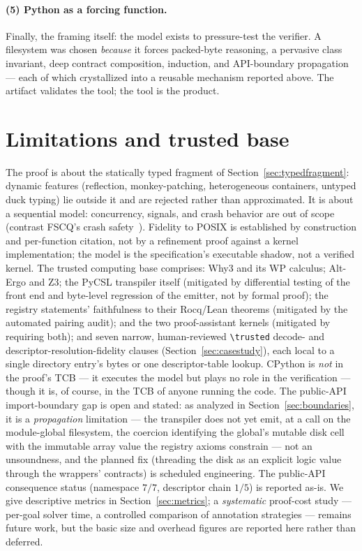 \documentclass[11pt]{article}
\newcommand{\pycsl}{\textsf{PyCSL}}
\newcommand{\why}{\textsf{Why3}}
\newcommand{\altergo}{\textsf{Alt-Ergo}}
\newcommand{\zthree}{\textsf{Z3}}
\newcommand{\rocq}{\textsf{Rocq}}
\newcommand{\lean}{\textsf{Lean}}
\begin{document}
\paragraph{(5) Python as a forcing function.}
Finally, the framing itself: the model exists to pressure-test the verifier.
A filesystem was chosen \emph{because} it forces packed-byte reasoning, a
pervasive class invariant, deep contract composition, induction, and
API-boundary propagation --- each of which crystallized into a reusable
mechanism reported above. The artifact validates the tool; the tool is the
product.

\section{Limitations and trusted base}\label{sec:limits}

The proof is about the statically typed fragment of
Section~\ref{sec:typedfragment}: dynamic features (reflection,
monkey-patching, heterogeneous containers, untyped duck typing) lie outside
it and are rejected rather than approximated. It is about a sequential
model: concurrency, signals, and crash behavior are out of scope (contrast FSCQ's crash safety~\cite{fscq}).
Fidelity to POSIX is established by construction and per-function citation,
not by a refinement proof against a kernel implementation; the model is the
specification's executable shadow, not a verified kernel. The trusted
computing base comprises: \why{} and its WP calculus; \altergo{} and
\zthree{}; the \pycsl{} transpiler itself (mitigated by differential testing
of the front end and byte-level regression of the emitter, not by formal
proof); the registry statements' faithfulness to their \rocq{}/\lean{}
theorems (mitigated by the automated pairing audit); and the two
proof-assistant kernels (mitigated by requiring both); and seven narrow,
human-reviewed \texttt{\textbackslash trusted} decode- and
descriptor-resolution-fidelity clauses (Section~\ref{sec:casestudy}), each
local to a single directory entry's bytes or one descriptor-table lookup.
CPython is \emph{not} in the proof's TCB --- it executes the model but plays no
role in the verification --- though it is, of course, in the TCB of anyone
running the code. The public-API import-boundary gap is open and stated: as analyzed in
Section~\ref{sec:boundaries}, it is a \emph{propagation} limitation --- the
transpiler does not yet emit, at a call on the module-global filesystem, the
coercion identifying the global's mutable disk cell with the immutable array
value the registry axioms constrain --- not an unsoundness, and the planned fix
(threading the disk as an explicit logic value through the wrappers' contracts)
is scheduled engineering. The public-API consequence status (namespace $7/7$,
descriptor chain $1/5$) is reported as-is. We give
descriptive metrics in Section~\ref{sec:metrics}; a \emph{systematic}
proof-cost study --- per-goal solver time, a controlled comparison of
annotation strategies --- remains future work, but the basic size and overhead
figures are reported here rather than deferred.
\end{document}
